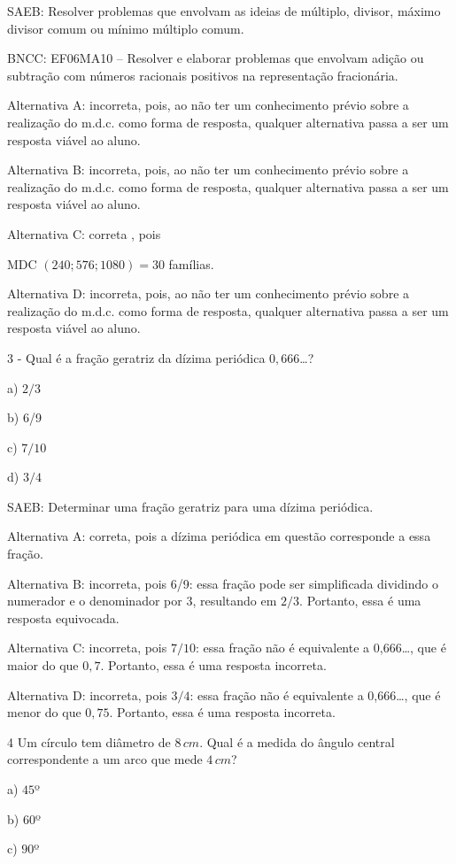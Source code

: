 SAEB: Resolver problemas que envolvam as ideias de múltiplo, divisor,
máximo divisor comum ou mínimo múltiplo comum.

BNCC: EF06MA10 -- Resolver e elaborar problemas que envolvam adição ou
subtração com números racionais positivos na representação fracionária.

Alternativa A: incorreta, pois, ao não ter um conhecimento prévio sobre
a realização do m.d.c. como forma de resposta, qualquer alternativa
passa a ser um resposta viável ao aluno.

Alternativa B: incorreta, pois, ao não ter um conhecimento prévio sobre
a realização do m.d.c. como forma de resposta, qualquer alternativa
passa a ser um resposta viável ao aluno.

Alternativa C: correta , pois

MDC $(240; 576; 1 080) = 30$ famílias.

Alternativa D: incorreta, pois, ao não ter um conhecimento prévio sobre
a realização do m.d.c. como forma de resposta, qualquer alternativa
passa a ser um resposta viável ao aluno.

3 - Qual é a fração geratriz da dízima periódica $0,666$\ldots?

a) $2/3$

b) $6$/9

c) $7/10$

d) $3/4$

SAEB: Determinar uma fração geratriz para uma dízima periódica.

Alternativa A: correta, pois a dízima periódica em questão corresponde a
essa fração.

Alternativa B: incorreta, pois $6$/9: essa fração pode ser simplificada
dividindo o numerador e o denominador por $3$, resultando em $2/3$.
Portanto, essa é uma resposta equivocada.

Alternativa C: incorreta, pois $7/10$: essa fração não é equivalente a
0,666\ldots, que é maior do que $0,7$. Portanto, essa é uma resposta
incorreta.

Alternativa D: incorreta, pois $3/4$: essa fração não é equivalente a
0,666\ldots, que é menor do que $0,75$. Portanto, essa é uma resposta
incorreta.

\num{4}  Um círculo tem diâmetro de $8\,cm$. Qual é a medida do ângulo central
correspondente a um arco que mede $4\,cm$?

a) $45$º

b) $60$º

c) $90$º


